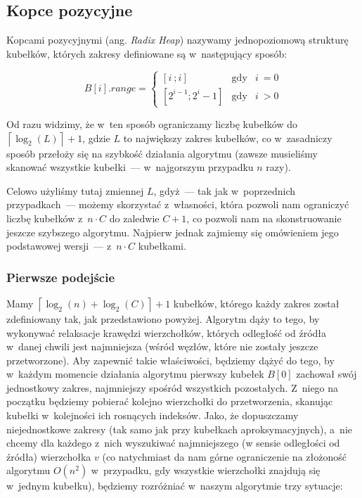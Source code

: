 \newpage
\subsection{Kopce pozycyjne}

Kopcami pozycyjnymi (ang. \textit{Radix Heap}) nazywamy jednopoziomową strukturę kubełków, których zakresy definiowane są w~następujący sposób:

\begin{equation}
B \left[ i \right].range = \left\{\begin{matrix}
 \left[ i~; i \right ]& \textrm{gdy} & i~= 0 \\ 
 \left[ 2^{i-1} ; 2^{i} - 1 \right ]& \textrm{gdy} & i~> 0
\end{matrix}\right.
\end{equation}

Od razu widzimy, że w~ten sposób ograniczamy liczbę kubełków do $ \left \lceil \log_{2} \left( L \right) \right \rceil + 1$, gdzie $L$ to największy zakres kubełków, co w~zasadniczy sposób przełoży się na szybkość działania algorytmu (zawsze musieliśmy skanować wszystkie kubełki~--- w~najgorszym przypadku $n$ razy).

Celowo użyliśmy tutaj zmiennej $L$, gdyż~--- tak jak w~poprzednich przypadkach~--- możemy skorzystać z~własności, która pozwoli nam ograniczyć liczbę kubełków z~$n \cdot C$ do zaledwie $C + 1$, co pozwoli nam na skonstruowanie jeszcze szybszego algorytmu. Najpierw jednak zajmiemy się omówieniem jego podstawowej wersji~--- z~$n \cdot C$ kubełkami.

\subsubsection{Pierwsze podejście}

Mamy $ \left \lceil \log_{2} \left( n \right) + \log_{2} \left( C \right) \right \rceil + 1$ kubełków, którego każdy zakres został zdefiniowany tak, jak przedstawiono powyżej. Algorytm dąży to tego, by wykonywać relaksacje krawędzi wierzchołków, których odległość od źródła w~danej chwili jest najmniejsza (wśród węzłów, które nie zostały jeszcze przetworzone). Aby zapewnić takie właściwości, będziemy dążyć do tego, by w~każdym momencie działania algorytmu pierwszy kubełek $B \left[ 0 \right]$ zachował swój jednostkowy zakres, najmniejszy spośród wszystkich pozostałych. Z~niego na początku będziemy pobierać kolejno wierzchołki do przetworzenia, skanując kubełki w~kolejności ich rosnących indeksów. Jako, że dopuszczamy niejednostkowe zakresy (tak samo jak przy kubełkach aproksymacyjnych), a~nie chcemy dla każdego z~nich wyszukiwać najmniejszego (w sensie odległości od źródła) wierzchołka $v$ (co natychmiast da nam górne ograniczenie na złożoność algorytmu $ O \left( n ^{2} \right)$ w~przypadku, gdy wszystkie wierzchołki znajdują się w~jednym kubełku), będziemy rozróżniać w~naszym algorytmie trzy sytuacje:

